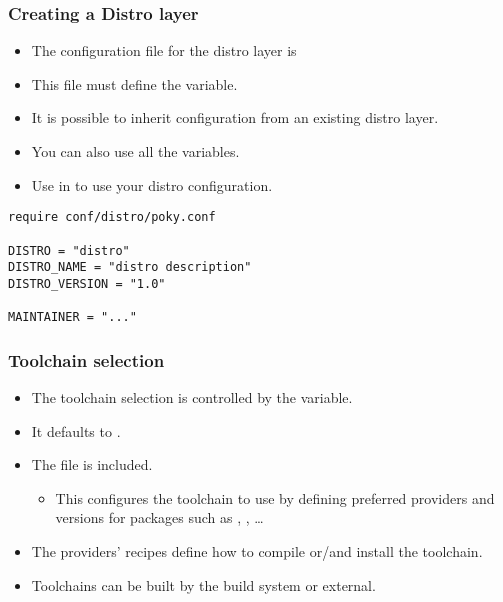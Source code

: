 \begin{frame}[fragile]
  \frametitle{Creating a Distro layer}
  \begin{itemize}
    \item The configuration file for the distro layer is
    \item This file must define the  variable.
    \item It is possible to inherit configuration from an existing
      distro layer.
    \item You can also use all the  variables.
    \item Use  in  to use
      your distro configuration.
  \end{itemize}
  \begin{block}{}
    \begin{verbatim}
require conf/distro/poky.conf

DISTRO = "distro"
DISTRO_NAME = "distro description"
DISTRO_VERSION = "1.0"

MAINTAINER = "..."
    \end{verbatim}
  \end{block}
\end{frame}

\begin{frame}
  \frametitle{Toolchain selection}
  \begin{itemize}
    \item The toolchain selection is controlled by the 
      variable.
    \item It defaults to .
    \item The  file is
      included.
    \begin{itemize}
      \item This configures the toolchain to use by defining preferred
        providers and versions for packages such as ,
        , \dots
    \end{itemize}
    \item The providers' recipes define how to compile or/and install
      the toolchain.
    \item Toolchains can be built by the build system or external.
  \end{itemize}
\end{frame}

